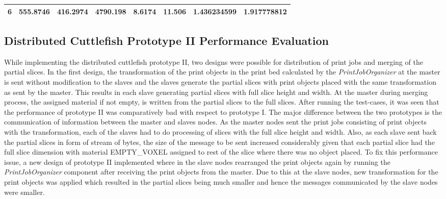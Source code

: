 \begin{table}[]
{\begin{tabular}{|l|l|l|l|l|l|l|l|}
6                                                                                     & 555.8746                                                                                                           & 416.2974                                                                                                               & 4790.198                                                                                                                           & 8.6174                                                                                               & 11.506                                                                                                 & 1.436234599                                                                                          & 1.917778812                                                                                            \\ \hline
\end{tabular}}
\end{table}



\subsection{Distributed Cuttlefish Prototype II Performance Evaluation} \label{ProtoIIDesigns}

While implementing the distributed cuttlefish prototype II, two designs were possible for distribution of print jobs and merging of the partial slices. In the first design, the transformation of the print objects in the print bed calculated by the \textit{PrintJobOrganizer} at the master is sent without modification to the slaves and the slaves generate the partial slices with print objects placed with the same transformation as sent by the master. This results in each slave generating partial slices with full slice height and width. At the master during merging process, the assigned material if not empty, is written from the partial slices to the full slices. After running the test-cases, it was seen that the performance of prototype II was comparatively bad with respect to prototype I. The major difference between the two prototypes is the communication of information between the master and slaves nodes. As the master nodes sent the print jobs consisting of print objects with the transformation, each of the slaves had to do processing of slices with the full slice height and width. Also, as each slave sent back the partial slices in form of stream of bytes, the size of the message to be sent increased considerably given that each partial slice had the full slice dimension with material EMPTY\_VOXEL assigned to rest of the slice where there was no object placed.  To fix this performance issue, a new design of prototype II implemented where in the slave nodes rearranged the print objects again by running the \textit{PrintJobOrganizer} component after receiving the print objects from the master. Due to this at the slave nodes, new transformation for the print objects was applied which resulted in the partial slices being much smaller and hence the messages communicated by the slave nodes were smaller. \newline

